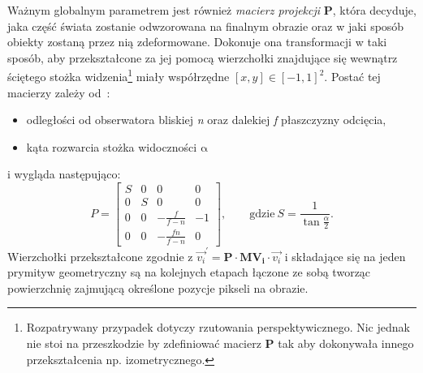 Ważnym globalnym parametrem jest również \textit{macierz projekcji} $\mathbf{P}$, która decyduje, jaka część świata zostanie odwzorowana na finalnym obrazie oraz w jaki sposób obiekty zostaną przez nią zdeformowane. Dokonuje ona transformacji w taki sposób, aby przekształcone za jej pomocą wierzchołki znajdujące się wewnątrz ściętego stożka widzenia\footnote{Rozpatrywany przypadek dotyczy rzutowania perspektywicznego. Nic jednak nie stoi na przeszkodzie by zdefiniować macierz $\mathbf{P}$ tak aby dokonywała innego przekształcenia np. izometrycznego.} miały współrzędne $[x,y] \in [-1, 1]^2$. Postać tej macierzy zależy od~\cite{PerspectiveMatrix}:
\begin{itemize}
\item odległości od obserwatora bliskiej \textit{n} oraz dalekiej \textit{f} płaszczyzny odcięcia,
\item kąta rozwarcia stożka widoczności $\mathrm{\alpha}$
\end{itemize}
i wygląda następująco:
\begin{equation}
P = 
\begin{bmatrix}
S & 0 & 0 & 0 \\ 
0 & S & 0 & 0 \\ 
0 & 0 & -\frac{f}{f-n} & -1\\ 
0 & 0 & -\frac{fn}{f-n} & 0
\end{bmatrix},\qquad \mathrm{gdzie\ }S = \frac{1}{\tan\frac{\alpha}{2}}.
\end{equation}
Wierzchołki przekształcone zgodnie z $\vec{v_{i}}^{'} = \mathbf{P}\cdot\mathbf{MV_i}\cdot \vec{v_i}$ i składające się na jeden prymityw geometryczny są na kolejnych etapach łączone ze sobą tworząc powierzchnię zajmującą określone pozycje pikseli na obrazie. 
